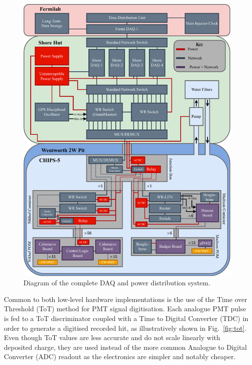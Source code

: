 \begin{figure} %
    \includegraphics[width=\textwidth]{diagrams/5-daq/daq.pdf}
    \caption[Diagram of the complete \chipsfive data acquisition and power distribution system.]
    {Diagram of the complete \chipsfive DAQ and power distribution system.}
    \label{fig:daq}
\end{figure}

Common to both low-level hardware implementations is the use of the Time over Threshold (ToT)
method for PMT signal digitisation. Each analogue PMT pulse is fed to a ToT discriminator coupled
with a Time to Digital Converter (TDC) in order to generate a digitised recorded hit, as
illustratively shown in Fig.~\ref{fig:tot}. Even though ToT values are less accurate and do not
scale linearly with deposited charge, they are used instead of the more common Analogue to Digital
Converter (ADC) readout as the electronics are simpler and notably cheaper.

